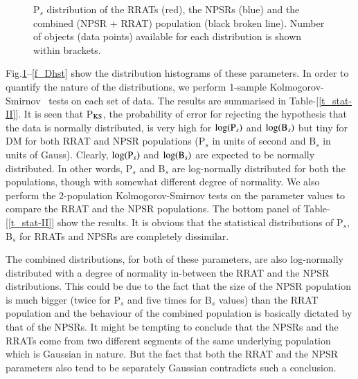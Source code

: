 \documentclass{jaa}
\newcommand{\bef}{\begin{figure}}
\newcommand{\eef}{\end{figure}}
\begin{document}
%
\bef
%
%
\caption{P$_s$ distribution of  the RRATs (red), the  NPSRs (blue) and
  the combined (NPSR + RRAT) population (black broken line). Number of
  objects  (data  points) available  for  each  distribution is  shown
  within brackets.}
%
\label{f_Phst} 
%
\eef
%

Fig.\ref{f_Phst}--\ref{f_Dhst}  show  the distribution  histograms  of
these  parameters.    In  order   to  quantify   the  nature   of  the
distributions,  we perform  1-sample Kolmogorov-Smirnov~\cite{mises64}
tests  on   each  set  of   data.   The  results  are   summarised  in
Table-[\ref{t_stat-II}].    It  is   seen  that   P$_{\rm  KS}$,   the
probability of  error for  rejecting the hypothesis  that the  data is
normally  distributed,   is  very  high  for   $\log({\rm  P}_s)$  and
$\log({\rm B}_s)$ but  tiny for DM for both RRAT  and NPSR populations
(P$_s$  in units  of second  and B$_s$  in units  of Gauss).  Clearly,
$\log({\rm P}_s)$  and $\log({\rm B}_s)$  are expected to  be normally
distributed.  In  other  words,   P$_s$  and  B$_s$  are  log-normally
distributed for  both the populations, though  with somewhat different
degree   of    normality.    We   also   perform    the   2-population
Kolmogorov-Smirnov tests on  the parameter values to  compare the RRAT
and the NPSR populations.  The bottom panel of Table-[\ref{t_stat-II}]
show the results.  It is obvious that the statistical distributions of
P$_s$, B$_s$ for RRATs and NPSRs are completely dissimilar.

The combined  distributions, for  both of  these parameters,  are also
log-normally  distributed with  a degree  of normality  in-between the
RRAT and the  NPSR distributions.  This could be due  to the fact that
the size  of the NPSR population  is much bigger (twice  for P$_s$ and
five  times  for  B$_s$  values)  than the  RRAT  population  and  the
behaviour of the combined population  is basically dictated by that of
the NPSRs.   It might be tempting  to conclude that the  NPSRs and the
RRATs  come  from  two  different  segments  of  the  same  underlying
population which  is Gaussian in  nature. But  the fact that  both the
RRAT  and the  NPSR parameters  also  tend to  be separately  Gaussian
contradicts such a conclusion.
\end{document}

